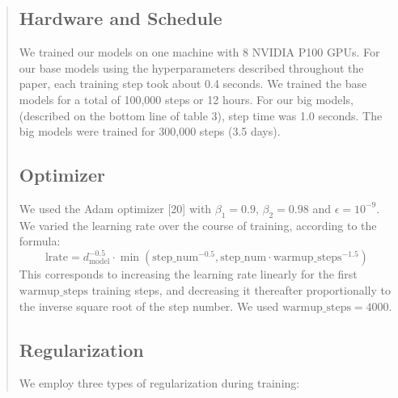 \documentclass[12pt, a4paper]{article}
\begin{document}
\begin{abstract}
\subsection{Hardware and Schedule}
We trained our models on one machine with 8 NVIDIA P100 GPUs. For our base models using the hyperparameters described throughout the paper, each training step took about 0.4 seconds. We trained the base models for a total of 100,000 steps or 12 hours. For our big models, (described on the bottom line of table 3), step time was 1.0 seconds. The big models were trained for 300,000 steps (3.5 days).

\subsection{Optimizer}
We used the Adam optimizer [20] with $\beta_1 = 0.9$, $\beta_2 = 0.98$ and $\epsilon = 10^{-9}$. We varied the learning rate over the course of training, according to the formula:
\begin{equation}
\label{eq:lrate}
\text{lrate} = d_{\text{model}}^{-0.5} \cdot \min(\text{step\_num}^{-0.5}, \text{step\_num} \cdot \text{warmup\_steps}^{-1.5})
\end{equation}
This corresponds to increasing the learning rate linearly for the first $\text{warmup\_steps}$ training steps, and decreasing it thereafter proportionally to the inverse square root of the step number. We used $\text{warmup\_steps} = 4000$.

\subsection{Regularization}
We employ three types of regularization during training:


\end{abstract}
\end{document}
